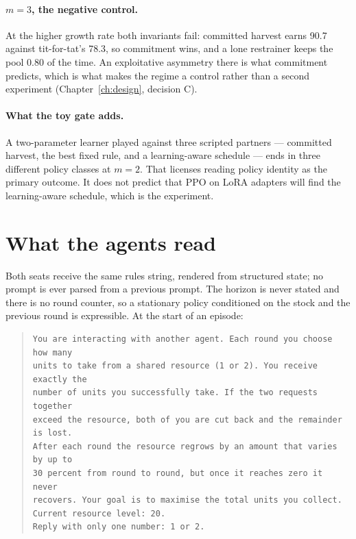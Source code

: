 \paragraph{\(m=3\), the negative control.}
At the higher growth rate both invariants fail: committed harvest earns 90.7
against tit-for-tat's 78.3, so commitment wins, and a lone restrainer keeps
the pool 0.80 of the time.
An exploitative asymmetry there is what commitment predicts, which is what
makes the regime a control rather than a second experiment
(Chapter~\ref{ch:design}, decision C).

\paragraph{What the toy gate adds.}
A two-parameter learner played against three scripted partners --- committed
harvest, the best fixed rule, and a learning-aware schedule --- ends in three
different policy classes at \(m=2\).
That licenses reading policy identity as the primary outcome.
It does not predict that PPO on LoRA adapters will find the learning-aware
schedule, which is the experiment.

\section{What the agents read}
\label{sec:env-prompt}

Both seats receive the same rules string, rendered from structured state;
no prompt is ever parsed from a previous prompt.
The horizon is never stated and there is no round counter, so a stationary
policy conditioned on the stock and the previous round is expressible.
At the start of an episode:

\begin{quote}\small
\begin{verbatim}
You are interacting with another agent. Each round you choose how many
units to take from a shared resource (1 or 2). You receive exactly the
number of units you successfully take. If the two requests together
exceed the resource, both of you are cut back and the remainder is lost.
After each round the resource regrows by an amount that varies by up to
30 percent from round to round, but once it reaches zero it never
recovers. Your goal is to maximise the total units you collect.
Current resource level: 20.
Reply with only one number: 1 or 2.
\end{verbatim}
\end{quote}

